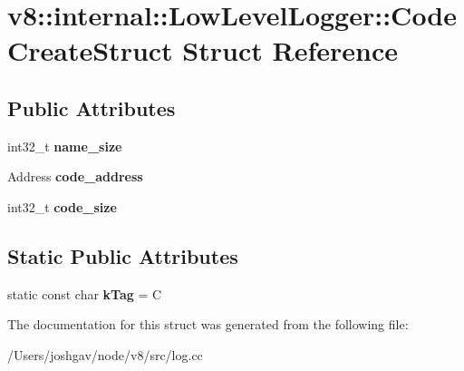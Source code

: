\hypertarget{structv8_1_1internal_1_1_low_level_logger_1_1_code_create_struct}{}\section{v8\+:\+:internal\+:\+:Low\+Level\+Logger\+:\+:Code\+Create\+Struct Struct Reference}
\label{structv8_1_1internal_1_1_low_level_logger_1_1_code_create_struct}
\subsection*{Public Attributes}
\begin{DoxyCompactItemize}
\item 
int32\+\_\+t {\bfseries name\+\_\+size}\hypertarget{structv8_1_1internal_1_1_low_level_logger_1_1_code_create_struct_a70dcf06b4677f11b5a3a0d9fbd230abc}{}\label{structv8_1_1internal_1_1_low_level_logger_1_1_code_create_struct_a70dcf06b4677f11b5a3a0d9fbd230abc}

\item 
Address {\bfseries code\+\_\+address}\hypertarget{structv8_1_1internal_1_1_low_level_logger_1_1_code_create_struct_a7381cfe7ba677f34e641c0cb76d7a709}{}\label{structv8_1_1internal_1_1_low_level_logger_1_1_code_create_struct_a7381cfe7ba677f34e641c0cb76d7a709}

\item 
int32\+\_\+t {\bfseries code\+\_\+size}\hypertarget{structv8_1_1internal_1_1_low_level_logger_1_1_code_create_struct_a8f1bb49a39454b9877b2e29d5dab6b4a}{}\label{structv8_1_1internal_1_1_low_level_logger_1_1_code_create_struct_a8f1bb49a39454b9877b2e29d5dab6b4a}

\end{DoxyCompactItemize}
\subsection*{Static Public Attributes}
\begin{DoxyCompactItemize}
\item 
static const char {\bfseries k\+Tag} = \textquotesingle{}C\textquotesingle{}\hypertarget{structv8_1_1internal_1_1_low_level_logger_1_1_code_create_struct_a3e0f41686b32257f1e44aa99a1e75701}{}\label{structv8_1_1internal_1_1_low_level_logger_1_1_code_create_struct_a3e0f41686b32257f1e44aa99a1e75701}

\end{DoxyCompactItemize}


The documentation for this struct was generated from the following file\+:\begin{DoxyCompactItemize}
\item 
/\+Users/joshgav/node/v8/src/log.\+cc\end{DoxyCompactItemize}
